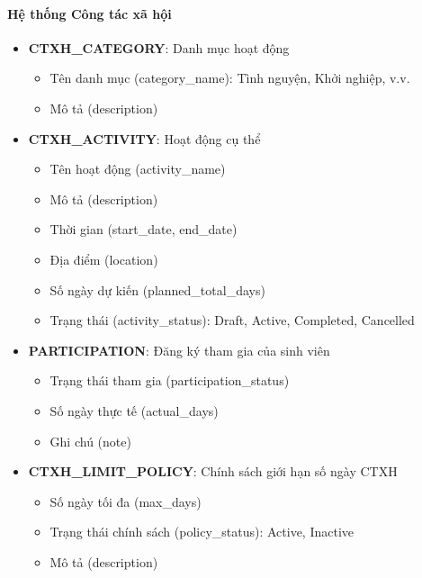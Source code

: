 \paragraph{Hệ thống Công tác xã hội}

\begin{itemize}[leftmargin=*]
    \item \textbf{CTXH\_CATEGORY}: Danh mục hoạt động
    \begin{itemize}
        \item Tên danh mục (category\_name): Tình nguyện, Khởi nghiệp, v.v.
        \item Mô tả (description)
    \end{itemize}
    
    \item \textbf{CTXH\_ACTIVITY}: Hoạt động cụ thể
    \begin{itemize}
        \item Tên hoạt động (activity\_name)
        \item Mô tả (description)
        \item Thời gian (start\_date, end\_date)
        \item Địa điểm (location)
        \item Số ngày dự kiến (planned\_total\_days)
        \item Trạng thái (activity\_status): Draft, Active, Completed, Cancelled
    \end{itemize}
    
    \item \textbf{PARTICIPATION}: Đăng ký tham gia của sinh viên
    \begin{itemize}
        \item Trạng thái tham gia (participation\_status)
        \item Số ngày thực tế (actual\_days)
        \item Ghi chú (note)
    \end{itemize}
    
    \item \textbf{CTXH\_LIMIT\_POLICY}: Chính sách giới hạn số ngày CTXH
    \begin{itemize}
        \item Số ngày tối đa (max\_days)
        \item Trạng thái chính sách (policy\_status): Active, Inactive
        \item Mô tả (description)
    \end{itemize}
\end{itemize}

